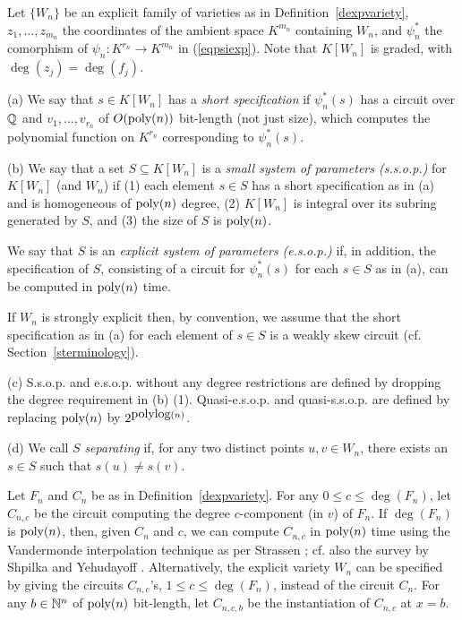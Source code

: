 \documentclass[11pt]{article}
\begin{document}
\begin{defn} \label{desopexp}
Let $\{W_n\}$ be an explicit family of varieties  as in
Definition~\ref{dexpvariety}, 
$z_1,\ldots,z_{m_n}$  the coordinates of the ambient 
space $K^{m_n}$ containing $W_n$, and 
$\psi_n^*$ the comorphism of $\psi_n: K^{r_n} \rightarrow K^{m_n}$ in (\ref{eqpsiexp}).
Note  that $K[W_n]$ is graded, with  $\deg(z_j)=\deg(f_j)$. 


\noindent (a) We say that  $s \in K[W_n]$ has  a {\em short specification} if 
$\psi^*_n(s)$ has a  circuit
over $\mathbb{Q}$ and  $v_1,\ldots,v_{r_n}$  of  $O({\mbox {poly}}(n))$  bit-length (not just size),
which   computes
the polynomial function on $K^{r_n}$ corresponding to $\psi_n^*(s)$. 


\noindent (b) We say that a set $S \subseteq K[W_n]$ is a {\em small  system of
parameters (s.s.o.p.)} for $K[W_n]$ (and $W_n$) if 
(1) each element $s \in S$ has a short specification as in  (a) and 
is homogeneous of ${\mbox {poly}}(n)$ degree, 
(2) $K[W_n]$ is integral over its subring  generated by $S$, and
(3) the size of $S$ is ${\mbox {poly}}(n)$. 



We say that $S$ is an {\em  explicit system of parameters (e.s.o.p.)} if, in addition, 
the specification of $S$, consisting of a circuit
for  $\psi_n^*(s)$ for each $s \in S$ as in (a), can be computed in ${\mbox {poly}}(n)$ time.

If $W_n$ is strongly explicit then, by convention, we assume that the short specification as in (a) for
each element of $s \in S$ is a weakly skew circuit (cf. Section~\ref{sterminology}).


\noindent (c) S.s.o.p. and  e.s.o.p. 
without any degree restrictions are defined by dropping the degree requirement in (b) (1).
Quasi-e.s.o.p. and quasi-s.s.o.p. are defined by replacing ${\mbox {poly}}(n)$ by $2^{{\mbox {polylog}}(n)}$.

\noindent (d) We call $S$ 
{\em separating} if, for any two distinct points $u,v \in W_n$, 
there exists an $s \in S$ such that 
$s(u)\not = s(v)$. 

\end{defn} 

Let $F_n$ and $C_n$ be as in Definition~\ref{dexpvariety}.
For any $0 \le c \le \deg(F_n)$, let $C_{n,c}$ be the circuit computing the degree $c$-component (in $v$) of $F_n$. 
If $\deg(F_n)$ is ${\mbox {poly}}(n)$, then, given $C_n$ and $c$, 
we can compute $C_{n,c}$ in ${\mbox {poly}}(n)$ time using the Vandermonde interpolation technique 
as per   Strassen \cite{strassen}; cf.  also the survey by Shpilka and Yehudayoff \cite
{yehu}.
Alternatively, the explicit variety $W_n$ can  be specified
by giving the circuits $C_{n,c}$'s, $1 \le c \le \deg(F_n)$, instead of the circuit $C_n$.
For any  $b\in \mathbb{N}^n$ of ${\mbox {poly}}(n)$ bit-length, let $C_{n,c,b}$ be the instantiation of $C_{n,c}$ at $x=b$. 
\end{document}
